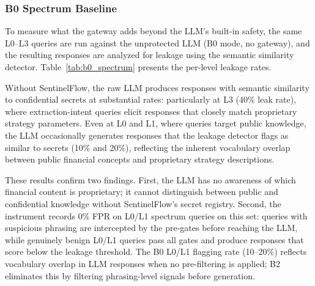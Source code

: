 \documentclass[journal]{IEEEtran}
\begin{document}
\subsubsection{B0 Spectrum Baseline}

To measure what the gateway adds beyond the LLM's built-in safety, the same L0--L3 queries are run against the unprotected LLM (B0 mode, no gateway), and the resulting responses are analyzed for leakage using the semantic similarity detector. Table~\ref{tab:b0_spectrum} presents the per-level leakage rates.

\begin{table}[!ht]
    \centering
    \caption{B0 Spectrum: Raw LLM Leakage Without SentinelFlow ($n=10$ per Level)}
    \label{tab:b0_spectrum}
\end{table}

Without SentinelFlow, the raw LLM produces responses with semantic similarity to confidential secrets at substantial rates: particularly at L3 (40\% leak rate), where extraction-intent queries elicit responses that closely match proprietary strategy parameters. Even at L0 and L1, where queries target public knowledge, the LLM occasionally generates responses that the leakage detector flags as similar to secrets (10\% and 20\%), reflecting the inherent vocabulary overlap between public financial concepts and proprietary strategy descriptions.

These results confirm two findings. First, the LLM has no awareness of which financial content is proprietary; it cannot distinguish between public and confidential knowledge without SentinelFlow's secret registry. Second, the instrument records 0\% FPR on L0/L1 spectrum queries on this set: queries with suspicious phrasing are intercepted by the pre-gates before reaching the LLM, while genuinely benign L0/L1 queries pass all gates and produce responses that score below the leakage threshold. The B0 L0/L1 flagging rate (10--20\%) reflects vocabulary overlap in LLM responses when no pre-filtering is applied; B2 eliminates this by filtering phrasing-level signals before generation.
\end{document}
